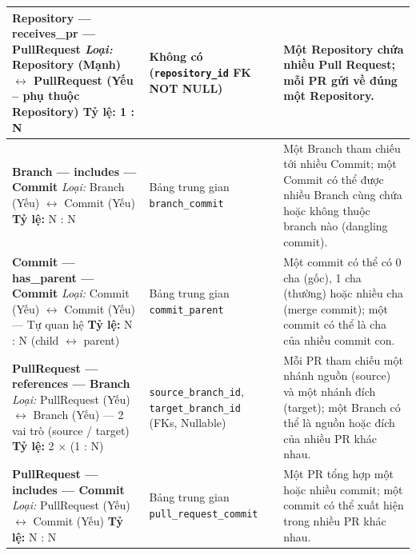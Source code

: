 \begin{longtable}{|
>{\raggedright\arraybackslash}p{}|
>{\raggedright\arraybackslash}p{}|
>{\raggedright\arraybackslash}p{}|}
\textbf{Repository --- receives\_pr --- PullRequest}\newline
\textit{Loại:} Repository (Mạnh) $\leftrightarrow$ PullRequest (Yếu -- phụ thuộc Repository)\newline
\textbf{Tỷ lệ:} 1 : N
& 
Không có \newline(\texttt{repository\_id} FK NOT NULL)
& 
Một Repository chứa nhiều Pull Request; mỗi PR gửi về đúng một Repository.
\\ \hline

\textbf{Branch --- includes --- Commit}\newline
\textit{Loại:} Branch (Yếu) $\leftrightarrow$ Commit (Yếu)\newline
\textbf{Tỷ lệ:} N : N
& 
Bảng trung gian \texttt{branch\_commit}
& 
Một Branch tham chiếu tới nhiều Commit; một Commit có thể được nhiều Branch cùng chứa hoặc không thuộc branch nào (dangling commit).
\\ \hline

\textbf{Commit --- has\_parent --- Commit}\newline
\textit{Loại:} Commit (Yếu) $\leftrightarrow$ Commit (Yếu) --- Tự quan hệ\newline
\textbf{Tỷ lệ:} N : N (child $\leftrightarrow$ parent)
& 
Bảng trung gian \texttt{commit\_parent}
& 
Một commit có thể có 0 cha (gốc), 1 cha (thường) hoặc nhiều cha (merge commit); một commit có thể là cha của nhiều commit con.
\\ \hline

\textbf{PullRequest --- references --- Branch}\newline
\textit{Loại:} PullRequest (Yếu) $\leftrightarrow$ Branch (Yếu) --- 2 vai trò (source / target)\newline
\textbf{Tỷ lệ:} 2 $\times$ (1 : N)
& 
\texttt{source\_branch\_id},\newline
\texttt{target\_branch\_id} (FKs, Nullable)
& 
Mỗi PR tham chiếu một nhánh nguồn (source) và một nhánh đích (target); một Branch có thể là nguồn hoặc đích của nhiều PR khác nhau.
\\ \hline

\textbf{PullRequest --- includes --- Commit}\newline
\textit{Loại:} PullRequest (Yếu) $\leftrightarrow$ Commit (Yếu)\newline
\textbf{Tỷ lệ:} N : N
& 
Bảng trung gian \texttt{pull\_request\_commit}
& 
Một PR tổng hợp một hoặc nhiều commit; một commit có thể xuất hiện trong nhiều PR khác nhau.
\\ \hline


\end{longtable}
